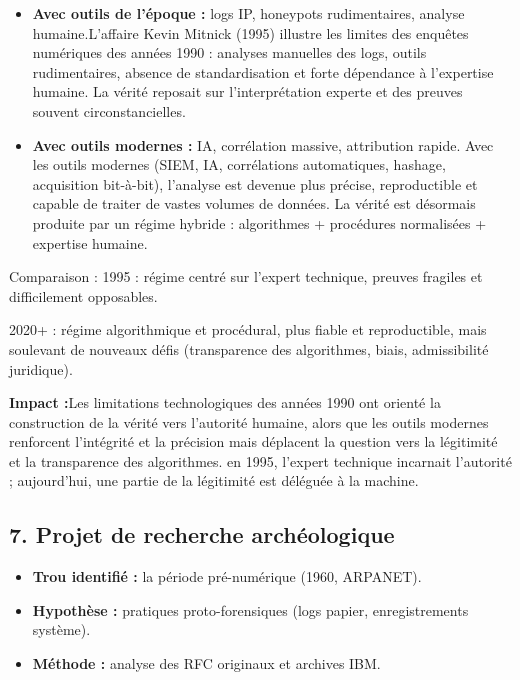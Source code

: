 \documentclass[12pt,a4paper]{article}
\begin{document}
	\begin{itemize}
		\item \textbf{Avec outils de l’époque :} logs IP, honeypots rudimentaires, analyse humaine.L’affaire Kevin Mitnick (1995) illustre les limites des enquêtes numériques des années 1990 : analyses manuelles des logs, outils rudimentaires, absence de standardisation et forte dépendance à l’expertise humaine. La vérité reposait sur l’interprétation experte et des preuves souvent circonstancielles.

		\item \textbf{Avec outils modernes :} IA, corrélation massive, attribution rapide.	Avec les outils modernes (SIEM, IA, corrélations automatiques, hashage, acquisition bit-à-bit), l’analyse est devenue plus précise, reproductible et capable de traiter de vastes volumes de données. La vérité est désormais produite par un régime hybride : algorithmes + procédures normalisées + expertise humaine.
	\end{itemize}
		Comparaison :
	1995 : régime centré sur l’expert technique, preuves fragiles et difficilement opposables.
	
	2020+ : régime algorithmique et procédural, plus fiable et reproductible, mais soulevant de nouveaux défis (transparence des algorithmes, biais, admissibilité juridique).
	
	\textbf{Impact :}Les limitations technologiques des années 1990 ont orienté la construction de la vérité vers l’autorité humaine, alors que les outils modernes renforcent l’intégrité et la précision mais déplacent la question vers la légitimité et la transparence des algorithmes. en 1995, l’expert technique incarnait l’autorité ; aujourd’hui, une partie de la légitimité est déléguée à la machine.
	
	\subsection*{7. Projet de recherche archéologique}
	
	\begin{itemize}
		\item \textbf{Trou identifié :} la période pré-numérique (1960, ARPANET).
		\item \textbf{Hypothèse :} pratiques proto-forensiques (logs papier, enregistrements système).
		\item \textbf{Méthode :} analyse des RFC originaux et archives IBM.
	\end{itemize}
	
\end{document}
